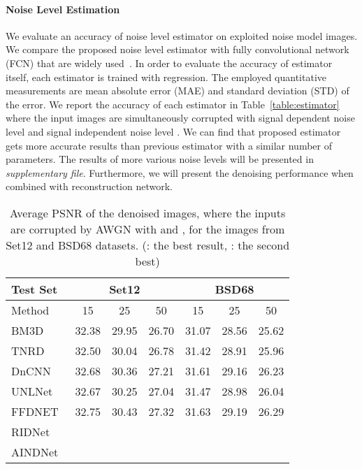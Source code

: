 \documentclass[10pt,twocolumn,letterpaper]{article}
\begin{document}
\paragraph{Noise Level Estimation} 
We evaluate an accuracy of noise level estimator on exploited noise model images.
We compare the proposed noise level estimator with fully convolutional network (FCN) that are widely used~\cite{guo2019toward,brooks2019unprocessing}.
In order to evaluate the accuracy of estimator itself, each estimator is trained with  regression.
The employed quantitative measurements are mean absolute error (MAE) and standard deviation (STD) of the error.
We report the accuracy of each estimator in Table~\ref{table:estimator} where the input images are simultaneously corrupted with signal dependent noise level  and signal independent noise level .
We can find that proposed estimator gets more accurate results than previous estimator with a similar number of parameters.
The results of more various noise levels will be presented in \textit{supplementary file}.
Furthermore, we will present the denoising performance when combined with reconstruction network.  
\begin{table}[]
	\centering
	\caption{Average PSNR of the denoised images, where the inputs are corrupted by AWGN with  and , for the images from Set12 and BSD68 datasets. (\color{red}{red}: \color{black} the best result, \color{blue}{blue}: \color{black} the second best)}
	\label{table:AWGN}
	\begin{adjustbox}{width = 0.85\linewidth }
		\begin{tabular}{l|ccc|ccc}
			\toprule
			Test Set     & \multicolumn{3}{c|}{Set12} & \multicolumn{3}{c}{BSD68} \\
			\hline 
			Method   & 15      & 25     & 50     & 15      & 25     & 50     \\
			\hline \hline
			BM3D~\cite{dabov2007color}    & 32.38   & 29.95  & 26.70  & 31.07   & 28.56  & 25.62  \\
			TNRD~\cite{chen2016trainable}    & 32.50   & 30.04  & 26.78  & 31.42   & 28.91  & 25.96  \\
			DnCNN~\cite{zhang2017beyond}  & 32.68   & 30.36  & 27.21  & 31.61   & 29.16  & 26.23  \\
			UNLNet~\cite{lefkimmiatis2018universal}  & 32.67   & 30.25  & 27.04  & 31.47   & 28.98  & 26.04  \\
			FFDNET~\cite{zhang2018ffdnet}  & 32.75   & 30.43  & 27.32  & 31.63   & 29.19  & 26.29  \\
			RIDNet~\cite{Anwar_2019_ICCV}  & \color{blue}{32.91}   & \color{blue}{30.60}  & \color{blue}{27.43}  & \color{red}{31.81}   & \color{red}{29.34}  & \color{red}{26.40}  \\
			AINDNet & \color{red}{32.92}   & \color{red}{30.61}  & \color{red}{27.51}  & \color{blue}{31.69}   & \color{blue}{29.26}  & \color{blue}{26.32}  \\		
			\bottomrule
		\end{tabular}
	\end{adjustbox}
\end{table}
\end{document}
